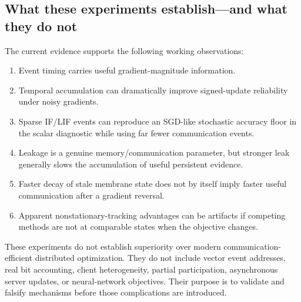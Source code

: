 \subsection{What these experiments establish---and what they do not}

The current evidence supports the following working observations:
\begin{enumerate}
  \item Event timing carries useful gradient-magnitude information.
  \item Temporal accumulation can dramatically improve signed-update reliability under noisy gradients.
  \item Sparse IF/LIF events can reproduce an SGD-like stochastic accuracy floor in the scalar diagnostic while using far fewer communication events.
  \item Leakage is a genuine memory/communication parameter, but stronger leak generally slows the accumulation of useful persistent evidence.
  \item Faster decay of stale membrane state does not by itself imply faster useful communication after a gradient reversal.
  \item Apparent nonstationary-tracking advantages can be artifacts if competing methods are not at comparable states when the objective changes.
\end{enumerate}

These experiments do not establish superiority over modern communication-efficient distributed optimization. They do not include vector event addresses, real bit accounting, client heterogeneity, partial participation, asynchronous server updates, or neural-network objectives. Their purpose is to validate and falsify mechanisms before those complications are introduced.
